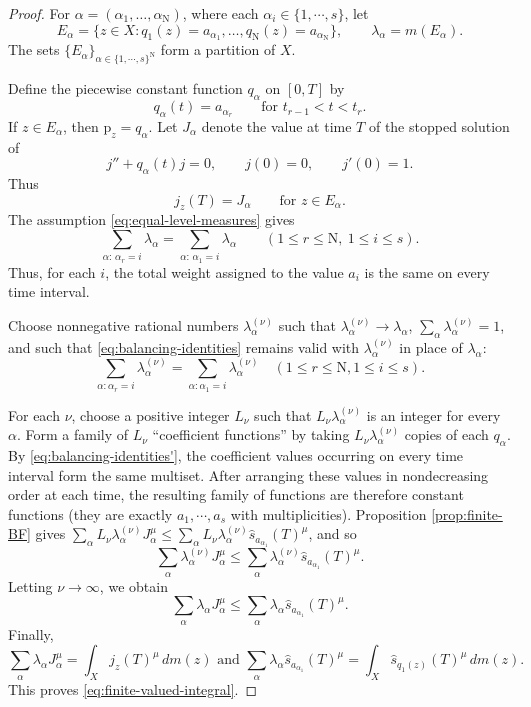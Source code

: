 \documentclass[11pt, reqno]{amsart}
\begin{document}
\begin{proof}
For $\alpha=(\alpha_1, \ldots, \alpha_{\mathrm{N}})$, where each $\alpha_i\in\{1, \cdots, s\}$, let
$$
E_\alpha
=
\{z\in X:
q_1(z)=a_{\alpha_1}, \ldots, q_{\mathrm{N}}(z)=a_{\alpha_{\mathrm{N}}}\},
\qquad
\lambda_\alpha=m(E_\alpha).
$$
The sets $\{E_\alpha\}_{\alpha\in \{1, \cdots, s\}^{\mathrm{N}}}$ form a partition of $X$.

Define the piecewise constant function $q_\alpha$ on $[0, T]$ by
$$
q_\alpha(t)=a_{\alpha_r}
\qquad\text{for }t_{r-1}<t<t_r.
$$
If $z\in E_\alpha$, then $\mathrm{p}_z=q_\alpha$. Let $J_\alpha$ denote the
value at time $T$ of the stopped solution of
$$
j''+q_\alpha(t)j=0,
\qquad
j(0)=0,
\qquad
j'(0)=1.
$$
Thus
$$
j_z(T)=J_\alpha
\qquad\text{for }z\in E_\alpha.
$$
The assumption \eqref{eq:equal-level-measures} gives
\begin{equation}\label{eq:balancing-identities}
\sum_{\alpha:\, \alpha_r=i}\lambda_\alpha = \sum_{\alpha:\, \alpha_1=i}\lambda_\alpha
\qquad
(1\le r\le {\mathrm{N}}, \ 1\le i\le s).
\end{equation}
Thus, for each $i$, the total weight assigned to the value $a_i$ is the
same on every time interval.

Choose nonnegative rational numbers $\lambda_\alpha^{(\nu)}$ such that $\lambda_\alpha^{(\nu)}\longrightarrow\lambda_\alpha$, \quad $\sum_\alpha\lambda_\alpha^{(\nu)}=1$, and such that \eqref{eq:balancing-identities} remains valid with
$\lambda_\alpha^{(\nu)}$ in place of $\lambda_\alpha$:
\begin{equation}\label{eq:balancing-identities'}
\sum_{\alpha: \alpha_r=i} \lambda^{(\nu)}_\alpha=\sum_{\alpha: \alpha_1=i} \lambda^{(\nu)}_\alpha \quad(1 \le r \le {\mathrm{N}}, 1 \le i \le s).
\end{equation}

For each $\nu$, choose a positive integer $L_\nu$ such that $L_\nu\lambda_\alpha^{(\nu)}$ is an integer for every $\alpha$. Form a family of $L_\nu$ ``coefficient functions'' by taking $L_\nu\lambda_\alpha^{(\nu)}$ copies of each $q_\alpha$. By \eqref{eq:balancing-identities'}, the coefficient values occurring on every time interval form the same multiset. After arranging these values in nondecreasing order at each time, the resulting family of functions are therefore constant functions (they are exactly $a_{1}, \cdots, a_s$ with multiplicities). Proposition \ref{prop:finite-BF} gives $\sum_\alpha L_\nu \lambda_\alpha^{(\nu)} J_\alpha^\mu \le \sum_\alpha L_\nu \lambda_\alpha^{(\nu)} \widehat{s}_{a_{\alpha_1}}(T)^\mu$, and so
$$
\sum_\alpha \lambda_\alpha^{(\nu)} J_\alpha^\mu \le \sum_\alpha \lambda_\alpha^{(\nu)} \widehat{s}_{a_{\alpha_1}}(T)^\mu.
$$
Letting $\nu\to\infty$, we obtain
$$
\sum_\alpha\lambda_\alpha J_\alpha^\mu
\le
\sum_\alpha\lambda_\alpha
\widehat s_{a_{\alpha_1}}(T)^\mu.
$$
Finally,
$$
\sum_\alpha\lambda_\alpha J_\alpha^\mu = \int_Xj_z(T)^\mu\, dm(z)
\text{ and }
\sum_\alpha\lambda_\alpha \widehat s_{a_{\alpha_1}}(T)^\mu = \int_X\widehat s_{q_1(z)}(T)^\mu\, dm(z).
$$
This proves \eqref{eq:finite-valued-integral}.
\end{proof}
\end{document}
